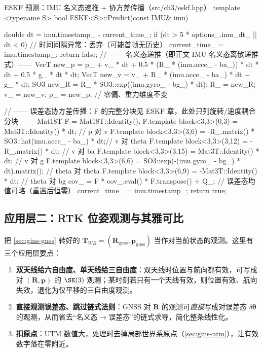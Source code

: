 \begin{codebox}[C++]{ESKF 预测：IMU 名义态递推 + 协方差传播（src/ch3/eskf.hpp）}
template <typename S>
bool ESKF<S>::Predict(const IMU& imu) {
  double dt = imu.timestamp_ - current_time_;
  if (dt > 5 * options_.imu_dt_ || dt < 0) {  // 时间间隔异常：丢弃（可能首帧无历史）
    current_time_ = imu.timestamp_;
    return false;
  }
  // —— 名义态递推（即正文 IMU 名义态离散递推式）——
  VecT new_p = p_ + v_ * dt + 0.5 * (R_ * (imu.acce_ - ba_)) * dt * dt + 0.5 * g_ * dt * dt;
  VecT new_v = v_ + R_ * (imu.acce_ - ba_) * dt + g_ * dt;
  SO3  new_R = R_ * SO3::exp((imu.gyro_ - bg_) * dt);
  R_ = new_R; v_ = new_v; p_ = new_p;   // 零偏、重力维度不变

  // —— 误差态协方差传播：F 的完整分块见 ESKF 章，此处只列旋转/速度耦合分块 ——
  Mat18T F = Mat18T::Identity();
  F.template block<3,3>(0,3)  = Mat3T::Identity() * dt;                       // p 对 v
  F.template block<3,3>(3,6)  = -R_.matrix() * SO3::hat(imu.acce_ - ba_) * dt;// v 对 theta
  F.template block<3,3>(3,12) = -R_.matrix() * dt;                            // v 对 ba
  F.template block<3,3>(3,15) =  Mat3T::Identity() * dt;                      // v 对 g
  F.template block<3,3>(6,6)  =  SO3::exp(-(imu.gyro_ - bg_) * dt).matrix();  // theta 对 theta
  F.template block<3,3>(6,9)  = -Mat3T::Identity() * dt;                      // theta 对 bg
  cov_ = F * cov_.eval() * F.transpose() + Q_;   // 误差态均值可略（重置后恒零）
  current_time_ = imu.timestamp_;
  return true;
}
\end{codebox}

\subsection{应用层二：RTK 位姿观测与其雅可比}
\label{sec:gins-rtk-update}

把 \cref{sec:gins-gnss} 转好的 $\mathbf{T}_{WB}=(\mathbf{R}_{\text{gnss}},\mathbf{p}_{\text{gnss}})$ 当作对当前状态的观测。这里有三个应用层要点\cite{gao2023slamad}：
\begin{enumerate}
  \item \textbf{双天线给六自由度、单天线给三自由度}：双天线时位置与航向都有效，可写成对 $(\mathbf{R},\mathbf{p})$ 的 $\SE(3)$ 观测；某时刻若只有一个天线有效，则位置有效、航向失效，退化为仅平移的三自由度观测。
  \item \textbf{直接观测误差态、跳过链式法则}：GNSS 对 $\mathbf{R}$ 的观测可\emph{直接}写成对误差态 $\delta\boldsymbol{\theta}$ 的观测，从而省去“名义态$\to$误差态”的链式求导，简化整条线性化。
  \item \textbf{扣原点}：UTM 数值大，处理时去掉局部世界系原点（\cref{sec:gins-utm}），让有效数字落在零附近。
\end{enumerate}

